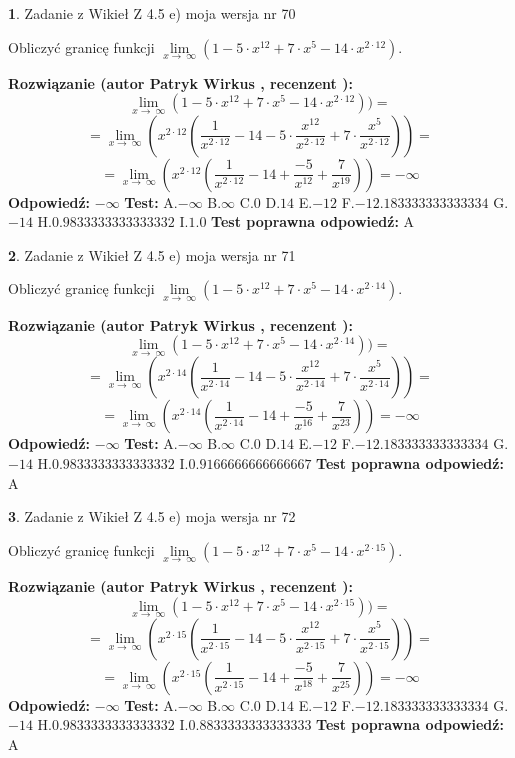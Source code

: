 \documentclass[12pt, a4paper]{article}
\theoremstyle{definition} %
\newtheorem{zad}{}
\newcommand{\zadStart}[1]{\begin{zad}#1\newline}
\newcommand{\zadStop}{\end{zad}}
\newcommand{\rozwStart}[2]{\noindent \textbf{Rozwiązanie (autor #1 , recenzent #2): }\newline}
\newcommand{\rozwStop}{\newline}
\newcommand{\odpStart}{\noindent \textbf{Odpowiedź:}\newline}
\newcommand{\odpStop}{\newline}
\newcommand{\testStart}{\noindent \textbf{Test:}\newline}
\newcommand{\testStop}{\newline}
\newcommand{\kluczStart}{\noindent \textbf{Test poprawna odpowiedź:}\newline}
\newcommand{\kluczStop}{\newline}
\begin{document}
\zadStart{Zadanie z Wikieł Z 4.5 e) moja wersja nr 70}


Obliczyć granicę funkcji  $\lim\limits_{x\to\ \infty}(1 - 5 \cdot x^{12}+7 \cdot x^{5}- 14 \cdot x^{2\cdot12})$.
\zadStop
\rozwStart{Patryk Wirkus}{}
$$\lim\limits_{x\to\ \infty}(1 - 5 \cdot x^{12}+7 \cdot x^{5}- 14 \cdot x^{2\cdot12}))=$$
$$=\lim\limits_{x\to\ \infty}(x^{2\cdot12}(\frac{1}{x^{2\cdot12}}-14 -5 \cdot \frac{x^{12}}{x^{2\cdot12}}+7 \cdot \frac{x^{5}}{x^{2\cdot12}}))=$$
$$=\lim\limits_{x\to\ \infty}(x^{2\cdot12}(\frac{1}{x^{2\cdot12}}-14 + \frac{-5}{x^{12}}+ \frac{7}{x^{19}}))=-\infty$$
\rozwStop
\odpStart
$-\infty$
\odpStop
\testStart
A.$-\infty$ B.$\infty$ C.$0$ D.$14$ E.$-12$
F.$-12.183333333333334$ G.$-14$
H.$0.9833333333333332$
I.$1.0$
\testStop
\kluczStart
A
\kluczStop



\zadStart{Zadanie z Wikieł Z 4.5 e) moja wersja nr 71}


Obliczyć granicę funkcji  $\lim\limits_{x\to\ \infty}(1 - 5 \cdot x^{12}+7 \cdot x^{5}- 14 \cdot x^{2\cdot14})$.
\zadStop
\rozwStart{Patryk Wirkus}{}
$$\lim\limits_{x\to\ \infty}(1 - 5 \cdot x^{12}+7 \cdot x^{5}- 14 \cdot x^{2\cdot14}))=$$
$$=\lim\limits_{x\to\ \infty}(x^{2\cdot14}(\frac{1}{x^{2\cdot14}}-14 -5 \cdot \frac{x^{12}}{x^{2\cdot14}}+7 \cdot \frac{x^{5}}{x^{2\cdot14}}))=$$
$$=\lim\limits_{x\to\ \infty}(x^{2\cdot14}(\frac{1}{x^{2\cdot14}}-14 + \frac{-5}{x^{16}}+ \frac{7}{x^{23}}))=-\infty$$
\rozwStop
\odpStart
$-\infty$
\odpStop
\testStart
A.$-\infty$ B.$\infty$ C.$0$ D.$14$ E.$-12$
F.$-12.183333333333334$ G.$-14$
H.$0.9833333333333332$
I.$0.9166666666666667$
\testStop
\kluczStart
A
\kluczStop



\zadStart{Zadanie z Wikieł Z 4.5 e) moja wersja nr 72}


Obliczyć granicę funkcji  $\lim\limits_{x\to\ \infty}(1 - 5 \cdot x^{12}+7 \cdot x^{5}- 14 \cdot x^{2\cdot15})$.
\zadStop
\rozwStart{Patryk Wirkus}{}
$$\lim\limits_{x\to\ \infty}(1 - 5 \cdot x^{12}+7 \cdot x^{5}- 14 \cdot x^{2\cdot15}))=$$
$$=\lim\limits_{x\to\ \infty}(x^{2\cdot15}(\frac{1}{x^{2\cdot15}}-14 -5 \cdot \frac{x^{12}}{x^{2\cdot15}}+7 \cdot \frac{x^{5}}{x^{2\cdot15}}))=$$
$$=\lim\limits_{x\to\ \infty}(x^{2\cdot15}(\frac{1}{x^{2\cdot15}}-14 + \frac{-5}{x^{18}}+ \frac{7}{x^{25}}))=-\infty$$
\rozwStop
\odpStart
$-\infty$
\odpStop
\testStart
A.$-\infty$ B.$\infty$ C.$0$ D.$14$ E.$-12$
F.$-12.183333333333334$ G.$-14$
H.$0.9833333333333332$
I.$0.8833333333333333$
\testStop
\kluczStart
A
\kluczStop
\end{document}
